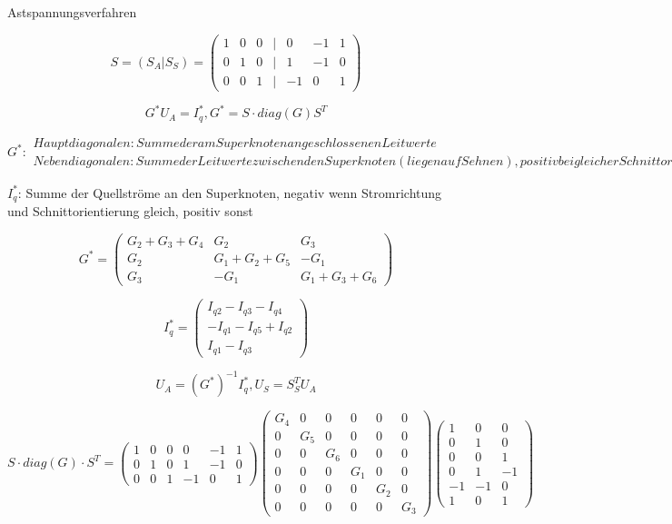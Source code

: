 \documentclass[german]{article}
\begin{document}
Astspannungsverfahren


\[
	S = ( S_A | S_S ) = \begin{pmatrix}
		1 & 0 & 0 & | & 0 & -1 & 1 \\
		0 & 1 & 0 & | & 1 & -1 & 0 \\
		0 & 0 & 1 & | & -1 & 0 & 1
	\end{pmatrix}
\]

\[
	G^* U_A = I_q^*, G^* = S \cdot diag(G) S^T
\]

$G^*: \begin{array}{l}
	Hauptdiagonalen: Summe der am Superknoten angeschlossenen Leitwerte \\
	Nebendiagonalen: Summe der Leitwerte zwischen den Superknoten (liegen auf Sehnen), positiv bei gleicher Schnittorientierung, negativ bei ungleicher Schnittorientierung
\end{array}$

$I_q^*$: Summe der Quellströme an den Superknoten, negativ wenn Stromrichtung und Schnittorientierung gleich, positiv sonst

\[
	G^* = \begin{pmatrix}
		G_2 + G_3 + G_4 & G_2 & G_3 \\
		G_2 & G_1 + G_2 + G_5 & -G_1 \\
		G_3 & -G_1 & G_1 + G_3 + G_6
	\end{pmatrix}
\]

\[
	I_q^* = \begin{pmatrix}
		I_{q2} - I_{q3} - I_{q4} \\
		- I_{q1} - I_{q5} + I_{q2} \\
		I_{q1} - I_{q3}
	\end{pmatrix}
\]

\[
	U_A = \left( G^* \right)^{-1} I_q^*, U_S = S_S^T U_A
\]

\[
	S \cdot diag(G) \cdot S^T = \begin{pmatrix}
		1 & 0 & 0 & 0 & -1 & 1 \\
		0 & 1 & 0 & 1 & -1 & 0 \\
		0 & 0 & 1 & -1 & 0 & 1
	\end{pmatrix}
	\begin{pmatrix}
		G_4 & 0 & 0 & 0 & 0 & 0 \\
		0 & G_5 & 0 & 0 & 0 & 0 \\
		0 & 0 & G_6 & 0 & 0 & 0 \\
		0 & 0 & 0 & G_1 & 0 & 0 \\
		0 & 0 & 0 & 0 & G_2 & 0 \\
		0 & 0 & 0 & 0 & 0 & G_3
	\end{pmatrix}
	\begin{pmatrix}
		1 & 0 & 0 \\
		0 & 1 & 0 \\
		0 & 0 & 1 \\
		0 & 1 & -1 \\
		-1 & -1 & 0 \\
		1 & 0 & 1
	\end{pmatrix}
\]
\end{document}
